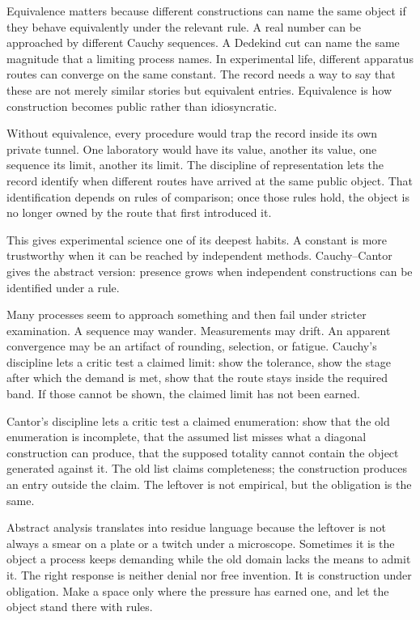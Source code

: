 Equivalence matters because different constructions can name the same
object if they behave equivalently under the relevant rule. A real
number can be approached by different Cauchy sequences. A Dedekind cut
can name the same magnitude that a limiting process names. In
experimental life, different apparatus routes can converge on the same
constant. The record needs a way to say that these are not merely
similar stories but equivalent entries. Equivalence is how construction
becomes public rather than idiosyncratic.

Without equivalence, every procedure would trap the record inside its
own private tunnel. One laboratory would have its value, another its
value, one sequence its limit, another its limit. The discipline of
representation lets the record identify when different routes have
arrived at the same public object. That identification depends on rules
of comparison; once those rules hold, the object is no longer owned by
the route that first introduced it.

This gives experimental science one of its deepest habits. A constant is
more trustworthy when it can be reached by independent methods.
Cauchy--Cantor gives the abstract version: presence grows when
independent constructions can be identified under a rule.

Many processes seem to approach something and then fail under stricter
examination. A sequence may wander. Measurements may drift. An apparent
convergence may be an artifact of rounding, selection, or fatigue.
Cauchy's discipline lets a critic test a claimed limit: show the
tolerance, show the stage after which the demand is met, show that the
route stays inside the required band. If those cannot be shown, the
claimed limit has not been earned.

Cantor's discipline lets a critic test a claimed enumeration: show that
the old enumeration is incomplete, that the assumed list misses what a
diagonal construction can produce, that the supposed totality cannot
contain the object generated against it. The old list claims completeness; the construction produces an entry
outside the claim. The leftover is
not empirical, but the obligation is the same.

Abstract analysis translates into residue language because the leftover
is not always a smear on a plate or a twitch under a microscope.
Sometimes it is the object a process keeps demanding while the old
domain lacks the means to admit it. The right response is neither denial
nor free invention. It is construction under obligation. Make a space
only where the pressure has earned one, and let the object stand there
with rules.

